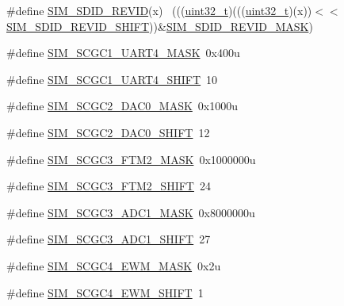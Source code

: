 \begin{DoxyCompactItemize}
\item 
\#define \hyperlink{group___s_i_m___register___masks_ga892bb65b3dc043087208ead1ea269b95}{S\+I\+M\+\_\+\+S\+D\+I\+D\+\_\+\+R\+E\+V\+ID}(x)                                            ~(((\hyperlink{_p_e___types_8h_a33594304e786b158f3fb30289278f5af}{uint32\+\_\+t})(((\hyperlink{_p_e___types_8h_a33594304e786b158f3fb30289278f5af}{uint32\+\_\+t})(x))$<$$<$\hyperlink{group___s_i_m___register___masks_gadb535428e0ca83d2494493ed04822b8c}{S\+I\+M\+\_\+\+S\+D\+I\+D\+\_\+\+R\+E\+V\+I\+D\+\_\+\+S\+H\+I\+FT}))\&\hyperlink{group___s_i_m___register___masks_gafefd91d0385c1b93049ec14409ed6b1e}{S\+I\+M\+\_\+\+S\+D\+I\+D\+\_\+\+R\+E\+V\+I\+D\+\_\+\+M\+A\+SK})
\item 
\#define \hyperlink{group___s_i_m___register___masks_ga8f954b824205f507499799ba8262b366}{S\+I\+M\+\_\+\+S\+C\+G\+C1\+\_\+\+U\+A\+R\+T4\+\_\+\+M\+A\+SK}~0x400u
\item 
\#define \hyperlink{group___s_i_m___register___masks_ga0808f41650f2b3824b779bf4f2273f08}{S\+I\+M\+\_\+\+S\+C\+G\+C1\+\_\+\+U\+A\+R\+T4\+\_\+\+S\+H\+I\+FT}~10
\item 
\#define \hyperlink{group___s_i_m___register___masks_gaa2ff8b125be9c2ba5100d9764d43ad90}{S\+I\+M\+\_\+\+S\+C\+G\+C2\+\_\+\+D\+A\+C0\+\_\+\+M\+A\+SK}~0x1000u
\item 
\#define \hyperlink{group___s_i_m___register___masks_gaae3b27d52cfc735e1bdb66bff969acec}{S\+I\+M\+\_\+\+S\+C\+G\+C2\+\_\+\+D\+A\+C0\+\_\+\+S\+H\+I\+FT}~12
\item 
\#define \hyperlink{group___s_i_m___register___masks_gafe5009515ab0955d724fa5306171aeeb}{S\+I\+M\+\_\+\+S\+C\+G\+C3\+\_\+\+F\+T\+M2\+\_\+\+M\+A\+SK}~0x1000000u
\item 
\#define \hyperlink{group___s_i_m___register___masks_gaa31635b220d66ac1a6f8f59b3d64cc6e}{S\+I\+M\+\_\+\+S\+C\+G\+C3\+\_\+\+F\+T\+M2\+\_\+\+S\+H\+I\+FT}~24
\item 
\#define \hyperlink{group___s_i_m___register___masks_gaf26716d3c8b3d13168bbb2c879e69db1}{S\+I\+M\+\_\+\+S\+C\+G\+C3\+\_\+\+A\+D\+C1\+\_\+\+M\+A\+SK}~0x8000000u
\item 
\#define \hyperlink{group___s_i_m___register___masks_ga45dd1ca87c734edcbe3b47feee134746}{S\+I\+M\+\_\+\+S\+C\+G\+C3\+\_\+\+A\+D\+C1\+\_\+\+S\+H\+I\+FT}~27
\item 
\#define \hyperlink{group___s_i_m___register___masks_ga374818f52beee72a9bafcb9efd573dbb}{S\+I\+M\+\_\+\+S\+C\+G\+C4\+\_\+\+E\+W\+M\+\_\+\+M\+A\+SK}~0x2u
\item 
\#define \hyperlink{group___s_i_m___register___masks_gabb62a44b4428fe9b594449f256278785}{S\+I\+M\+\_\+\+S\+C\+G\+C4\+\_\+\+E\+W\+M\+\_\+\+S\+H\+I\+FT}~1
$$
\end{DoxyCompactItemize}
